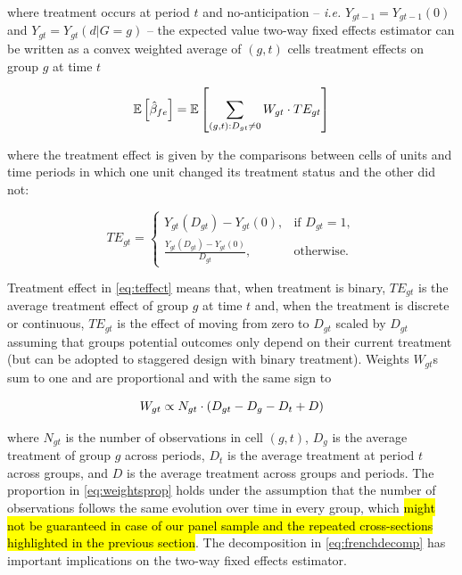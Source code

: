 \documentclass[11pt]{article}
\begin{document}
where treatment occurs at period $t$ and no-anticipation -- \textit{i.e.} $Y_{gt-1} = Y_{gt-1}(0)$ and $Y_{gt} = Y_{gt}(d | G = g)$ -- the expected value two-way fixed effects estimator can be written as a convex weighted average of $(g,t)$ cells treatment effects on group $g$ at time $t$

\begin{equation}
    \mathbb{E} \left[ \hat{\beta}_{fe} \right] = \mathbb{E} \left[ \sum_{(g,t) : D_{gt} \neq 0} W_{gt} \cdot TE_{gt} \right]\label{eq:frenchdecomp}
\end{equation}

where the treatment effect is given by the comparisons between cells of units and time periods in which one unit changed its treatment status and the other did not:

\begin{equation}
    TE_{gt} = 
    \begin{cases}
        Y_{gt}(D_{gt}) - Y_{gt}(0), & \text{if } D_{gt} = 1,\label{eq:teffect} \\
        \frac{Y_{gt}(D_{gt}) - Y_{gt}(0)}{D_{gt}}, & \text{otherwise}.
    \end{cases}
\end{equation}

Treatment effect in \eqref{eq:teffect} means that, when treatment is binary, $TE_{gt}$ is the average treatment effect of group $g$ at time $t$ and, when the treatment is discrete or continuous, $TE_{gt}$ is the effect of moving from zero to $D_{gt}$ scaled by $D_{gt}$ assuming that groups potential outcomes only depend on their current treatment (but can be adopted to staggered design with binary treatment). Weights $W_{gt}$s sum to one and are proportional and with the same sign to

\begin{equation}
    W_{gt} \propto N_{gt} \cdot \left( D_{gt} - D_{g} - D_{t} + D \right)\label{eq:weigthsprop}
\end{equation}

where $N_{gt}$ is the number of observations in cell $(g,t)$, $D_g$ is the average treatment of group $g$ across periods, $D_t$ is the average treatment at period $t$ across groups, and $D$ is the average treatment across groups and periods. The proportion in \eqref{eq:weightsprop} holds under the assumption that the number of observations follows the same evolution over time in every group, which \hl{might not be guaranteed in case of our panel sample and the repeated cross-sections highlighted in the previous section}. The decomposition in \eqref{eq:frenchdecomp} has important implications on the two-way fixed effects estimator.
\end{document}
